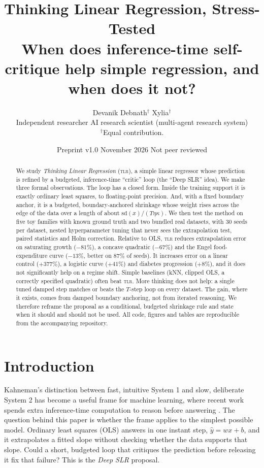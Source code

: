 \documentclass[10pt]{article}
\title{\textbf{Thinking Linear Regression, Stress-Tested}\\
\large When does inference-time self-critique help simple regression, and when does it not?}
\author{Devanik Debnath$^{\dagger}$ \qquad Xylia$^{\dagger}$\\[2pt]
\small Independent researcher \qquad AI research scientist (multi-agent research system)\\
\small $^{\dagger}$Equal contribution.}
\date{Preprint v1.0 \quad November 2026 \quad Not peer reviewed}
\newcommand{\TLR}{\textsc{tlr}}
\begin{document}
\maketitle

\begin{abstract}
We study \emph{Thinking Linear Regression} (\TLR), a simple linear regressor whose prediction is refined by a budgeted, inference-time ``critic'' loop (the ``Deep SLR'' idea). We make three formal observations. The loop has a closed form. Inside the training support it is exactly ordinary least squares, to floating-point precision. And, with a fixed boundary anchor, it is a budgeted, boundary-anchored shrinkage whose weight rises across the edge of the data over a length of about $\mathrm{sd}(x)/(T\eta\kappa)$. We then test the method on five toy families with known ground truth and two bundled real datasets, with 30 seeds per dataset, nested hyperparameter tuning that never sees the extrapolation test, paired statistics and Holm correction. Relative to OLS, \TLR{} reduces extrapolation error on saturating growth ($-81\%$), a concave quadratic ($-67\%$) and the Engel food-expenditure curve ($-13\%$, better on $87\%$ of seeds). It increases error on a linear control ($+377\%$), a logistic curve ($+41\%$) and diabetes progression ($+8\%$), and it does not significantly help on a regime shift. Simple baselines (kNN, clipped OLS, a correctly specified quadratic) often beat \TLR{}. More thinking does not help: a single tuned damped step matches or beats the $T$-step loop on every dataset. The gain, where it exists, comes from damped boundary anchoring, not from iterated reasoning. We therefore reframe the proposal as a conditional, budgeted shrinkage rule and state when it should and should not be used. All code, figures and tables are reproducible from the accompanying repository.
\end{abstract}

\section{Introduction}
Kahneman's distinction between fast, intuitive System 1 and slow, deliberate System 2 has become a useful frame for machine learning, where recent work spends extra inference-time computation to reason before answering \cite{kahneman2011,wei2022cot,snell2024}. The question behind this paper is whether the frame applies to the simplest possible model. Ordinary least squares (OLS) answers in one instant step, $\hat y = wx+b$, and it extrapolates a fitted slope without checking whether the data supports that slope. Could a short, budgeted loop that critiques the prediction before releasing it fix that failure? This is the \emph{Deep SLR} proposal.
\end{document}
